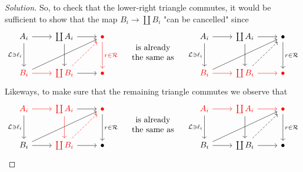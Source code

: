 \documentclass{article}
\numberwithin{equation}{section}
\newcommand{\Lc}{\mathcal{L}}
\newcommand{\Rc}{\mathcal{R}}
\begin{document}
\begin{proof}[Solution]
So, to check that the lower-right triangle commutes, it would be sufficient to show that the map $B_i\to\coprod B_i$ "can be cancelled" since
\[\begin{tikzcd}[row sep=large]
	A_i\arrow[r]\arrow[d,"\Lc\ni\ell_i",swap]&\coprod A_i\arrow[d]\arrow[r]&{\color{red}\bullet}\arrow[d,"r\in\Rc",red]\\
	{\color{red}B_i}\arrow[r,red]\arrow[rru]&{\color{red}\coprod B_i}\arrow[r]\arrow[ur,dashed,red]&{\color{red}\bullet}
\end{tikzcd}\quad
\begin{array}{c}
	\text{is already}\\
	\text{the same as}
\end{array}\quad
\begin{tikzcd}[row sep=large]
A_i\arrow[r]\arrow[d,"\Lc\ni\ell_i",swap]&\coprod A_i\arrow[d]\arrow[r]&\bullet\arrow[d,"r\in\Rc"]\\
{\color{red}B_i}\arrow[r,red]\arrow[rru]&{\color{red}\coprod B_i}\arrow[r,red]\arrow[ur,dashed]&{\color{red}\bullet}
\end{tikzcd}\]
Likeways, to make sure that the remaining triangle commutes we observe that
\[\begin{tikzcd}[row sep=large]
	{\color{red}A_i}\arrow[r,red]\arrow[d,"\Lc\ni\ell_i",swap]&{\color{red}\coprod A_i}\arrow[d,red]\arrow[r]&{\color{red}\bullet}\arrow[d,"r\in\Rc"]\\
	B_i\arrow[r]\arrow[rru]&{\color{red}\coprod B_i}\arrow[r]\arrow[ur,dashed,red]&\bullet
\end{tikzcd}\quad
\begin{array}{c}
	\text{is already}\\
	\text{the same as}
\end{array}
\quad
\begin{tikzcd}[row sep=large]
	{\color{red}A_i}\arrow[r,red]\arrow[d,"\Lc\ni\ell_i",swap]&{\color{red}\coprod A_i}\arrow[d]\arrow[r,red]&{\color{red}\bullet}\arrow[d,"r\in\Rc"]\\
	B_i\arrow[r]\arrow[rru]&\coprod B_i\arrow[r]\arrow[ur,dashed]&\bullet
\end{tikzcd}\]
\end{proof}
\end{document}
